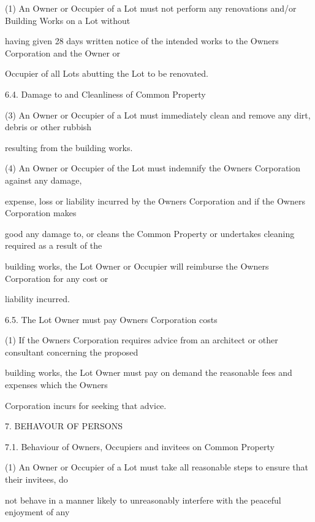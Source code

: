 \documentclass{article}
\begin{document}
{\fontsize{9.962}{1}(1) An Owner or Occupier of a Lot must not perform any renovations and/or Building Works on a Lot without }

{\fontsize{10.02}{1}having given 28 days written notice of the intended works to the Owners Corporation and the Owner or }

{\fontsize{10.02}{1}Occupier of all Lots abutting the Lot to be renovated. }

{\fontsize{9.99}{1}6.4. Damage to and Cleanliness of Common Property }

{\fontsize{9.962}{1}(3) An Owner or Occupier of a Lot must immediately clean and remove any dirt, debris or other rubbish }

{\fontsize{10.02}{1}resulting from the building works. }

{\fontsize{9.962}{1}(4) An Owner or Occupier of the Lot must indemnify the Owners Corporation against any damage, }

{\fontsize{10.02}{1}expense, loss or liability incurred by the Owners Corporation and if the Owners Corporation makes }

{\fontsize{10.02}{1}good any damage to, or cleans the Common Property or undertakes cleaning required as a result of the }

{\fontsize{10.02}{1}building works, the Lot Owner or Occupier will reimburse the Owners Corporation for any cost or }

{\fontsize{10.02}{1}liability incurred. }

{\fontsize{9.99}{1}6.5. The Lot Owner must pay Owners Corporation costs }

{\fontsize{9.962}{1}(1) If the Owners Corporation requires advice from an architect or other consultant concerning the proposed }

{\fontsize{10.02}{1}building works, the Lot Owner must pay on demand the reasonable fees and expenses which the Owners }

{\fontsize{10.02}{1}Corporation incurs for seeking that advice. }


{\fontsize{9.99}{1}7. BEHAVOUR OF PERSONS }

{\fontsize{9.99}{1}7.1. Behaviour of Owners, Occupiers and invitees on Common Property }

{\fontsize{9.962}{1}(1) An Owner or Occupier of a Lot must take all reasonable steps to ensure that their invitees, do }

{\fontsize{10.02}{1}not behave in a manner likely to unreasonably interfere with the peaceful enjoyment of any }
\end{document}
